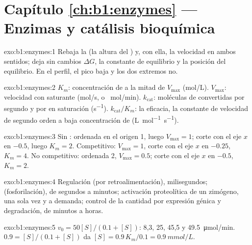 \section*{Capítulo \ref{ch:b1:enzymes} --- Enzimas y catálisis bioquímica}

\begin{solution}{exo:b1:enzymes:1}
Rebaja la  (la altura del ) y, con
ella, la velocidad en ambos sentidos; deja sin cambios $\Delta G$, la
constante de equilibrio y la posición del equilibrio. En el perfil, el pico
baja y los dos extremos no.
\end{solution}

\begin{solution}{exo:b1:enzymes:2}
$K_m$: concentración de  a la mitad de $V_{\max}$ (\unit{mol/L}).
$V_{\max}$: velocidad con  saturante (\unit{mol/s}, o \unit{\micro
mol/min}). $k_{\text{cat}}$: moléculas de  convertidas por segundo y
por  en saturación (\unit{s^{-1}}). $k_{\text{cat}}/K_m$: la eficacia,
la constante de velocidad de segundo orden a baja concentración de 
(\unit{L.mol^{-1}.s^{-1}}).
\end{solution}

\begin{solution}{exo:b1:enzymes:3}
Sin : ordenada en el origen 1, luego $V_{\max} = 1$; corte con el
eje $x$ en $-0.5$, luego $K_m = 2$. Competitivo: $V_{\max} = 1$, corte con
el eje $x$ en $-0.25$, $K_m = 4$. No competitivo: ordenada 2,
$V_{\max} = 0.5$; corte con el eje $x$ en $-0.5$, $K_m = 2$.
\end{solution}

\begin{solution}{exo:b1:enzymes:4}
Regulación  (por retroalimentación), milisegundos;  (fosforilación), de segundos a minutos; activación proteolítica de
un zimógeno, una sola vez y a demanda; control de la cantidad por expresión
génica y degradación, de minutos a horas.
\end{solution}

\begin{solution}{exo:b1:enzymes:5}
$v_0 = 50[S]/(0.1 + [S])$: 8,3, 25, 45,5 y \qty{49.5}{\micro mol/min}.
$0.9 = [S]/(0.1 + [S])$ da $[S] = 0.9\,K_m/0.1 = \qty{0.9}{mmol/L}$.
\end{solution}

